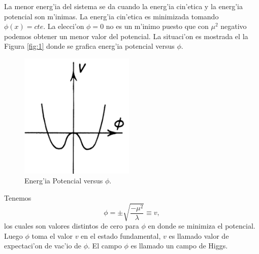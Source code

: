 La menor energ'ia del sistema se da cuando la energ'ia cin'etica y la energ'ia potencial son m'inimas. La energ'ia cin'etica es minimizada tomando $\phi(x)=cte$.
  La elecci'on $\phi=0$
  no es un m'inimo puesto que con $\mu^{2}$
  negativo podemos obtener un menor valor del potencial. La situaci'on es mostrada el la Figura \eqref{fig:1} donde se grafica energ'ia potencial versus $\phi.$
\begin{figure}[H]
 \centering
\includegraphics[height=6cm,angle=0]{IMAGEN1.pdf}
\caption{Energ'ia Potencial versus $\phi$.}
\label{fig:1}
\end{figure}
Tenemos
\begin{equation}\label{ecuacion8.4}
\phi=\pm\sqrt{\frac{-\mu^{2}}{\lambda}}\equiv v,
\end{equation}
los cuales son valores distintos de cero para $\phi$ en donde se minimiza el potencial. Luego $\phi$
  toma el valor $v$
  en el estado fundamental, $v$
  es llamado valor de expectaci'on de vac'io de $\phi$.
  El campo $\phi$
  es llamado un campo de Higgs.

